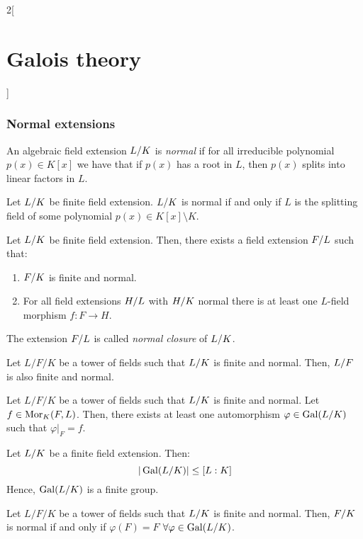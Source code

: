 \documentclass[../../../main.tex]{subfiles}
\begin{document}
\begin{multicols}{2}[\section{Galois theory}]
  \subsubsection{Normal extensions}
  \begin{definition}
    An algebraic field extension $\quot{L}{K}$ is \emph{normal} if for all irreducible polynomial $p(x)\in K[x]$ we have that if $p(x)$ has a root in $L$, then $p(x)$ splits into linear factors in $L$.
  \end{definition}
  \begin{theorem}
    Let $\quot{L}{K}$ be finite field extension. $\quot{L}{K}$ is normal if and only if $L$ is the splitting field of some polynomial $p(x)\in K[x]\setminus K$.
  \end{theorem}
  \begin{corollary}
    Let $\quot{L}{K}$ be finite field extension. Then, there exists a field extension $\quot{F}{L}$ such that:
    \begin{enumerate}
      \item $\quot{F}{K}$ is finite and normal.
      \item For all field extensions $\quot{H}{L}$ with $\quot{H}{K}$ normal there is at least one $L$-field morphism $f:F\rightarrow H$.
    \end{enumerate}
    The extension $\quot{F}{L}$ is called \emph{normal closure} of $\quot{L}{K}$.
  \end{corollary}
  \begin{corollary}
    Let $L/F/K$ be a tower of fields such that $\quot{L}{K}$ is finite and normal. Then, $\quot{L}{F}$ is also finite and normal.
  \end{corollary}
  \begin{corollary}
    Let $L/F/K$ be a tower of fields such that $\quot{L}{K}$ is finite and normal. Let $f\in\operatorname{Mor}_K(F,L)$. Then, there exists at least one automorphism $\varphi\in\Gal(\quot{L}{K})$ such that $\varphi|_F=f$.
  \end{corollary}
  \begin{corollary}
    Let $\quot{L}{K}$ be a finite field extension. Then: $$\textstyle|\Gal(\quot{L}{K})|\leq[L:K]$$ Hence, $\Gal(\quot{L}{K})$ is a finite group.
  \end{corollary}
  \begin{corollary}
    Let $L/F/K$ be a tower of fields such that $\quot{L}{K}$ is finite and normal. Then, $\quot{F}{K}$ is normal if and only if $\varphi(F)=F$ $\forall\varphi\in\Gal(\quot{L}{K})$.
  \end{corollary}

\end{multicols}
\end{document}
